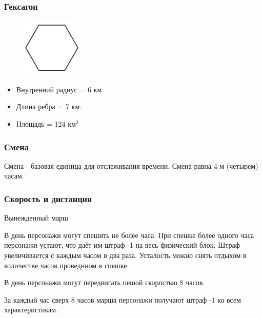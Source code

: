 \subsubsection*{Гексагон}
\begin{figure}[H]
  \centering
  \includegraphics*[width=0.25\textwidth]{./img/hexagon.pdf}
\end{figure}

\begin{itemize}
  \item Внутренний радиус = 6 км.
  \item Длина ребра = 7 км.
  \item Площадь = 124 $\text{км}^2$
\end{itemize}

\subsubsection*{Смена}
Смена - базовая единица для отслеживания времени. Смена равна 4-м (четырем) часам.

\subsubsection*{Скорость и дистанция}

\begin{mydescription}{Вынежденный марш}
  \item[Спешка] В день персонажи могут спешить не более часа. При спешке более одного часа персонажи устают,
  что даёт им штраф -1 на весь физический блок. Штраф увеличивается с каждым часом в два раза. Усталость можно снять
  отдыхом в количестве часов проведнном в спешке.
  \item[Марш] В день персонажи могут передвигать пешой скоростью 8 часов.
  \item[Форсированный марш] За каждый час сверх 8 часов марша персонажи получают штраф -1 ко всем характеристикам.
\end{mydescription}

